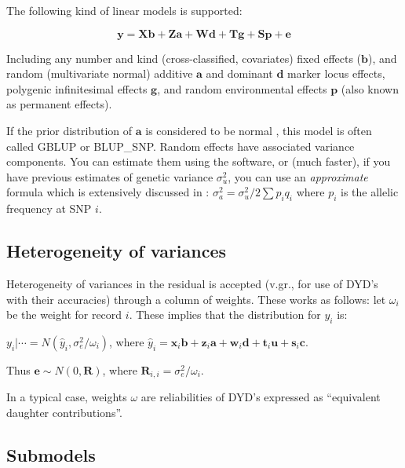 \documentclass[a4paper,12pt,titlepage]{article}      %
\newcommand{\bsr}{\mathbf} %
\begin{document}
The following kind of linear models is supported:

\begin{equation} \label{eq:SNPanimal}
 \bsr{y} = \bsr{X}\bsr{b} + \bsr{Za} + \bsr{Wd} + \bsr{Tg} + \bsr{Sp} + \bsr{e} 
\end{equation}

Including any number and kind (cross-classified, covariates) fixed effects ($\bsr{b}$), and random (multivariate normal) additive $\bsr{a}$ and dominant $\bsr{d}$ marker locus effects, polygenic infinitesimal effects $\bsr{g}$, and random environmental effects $\bsr{p}$ (also known as permanent effects).

 If the prior distribution of $\bsr{a}$ is considered to be normal \cite{VanRaden11012008}, this model is often called GBLUP or BLUP\_SNP. Random effects have associated variance components. You can estimate them using the software, or (much faster), if you have previous estimates of genetic variance $\sigma_u^2$, you can use an \emph{approximate} formula which is extensively discussed in \cite{Gianola2009a}:
$\sigma_a^2 = \sigma_u^2 / 2 \sum{p_i q_i}$
where $p_i$ is the allelic frequency at SNP $i$. 






\subsection{Heterogeneity of variances}


Heterogeneity of variances in the residual is accepted (v.gr., for use of DYD's with their accuracies) through a column of weights. These works as follows: let $\omega_i$ be the weight for record $i$. These implies that the distribution for $y_i$ is:

$y_i|\cdots = N(\hat{y}_i, \sigma_e^2 / \omega_i  )$, where 
$\hat{y}_i = \bsr{x}_i\bsr{b} + \bsr{z}_i\bsr{a} + \bsr{w}_i\bsr{d} + \bsr{t}_i\bsr{u} + \bsr{s}_i\bsr{c} $.

Thus $\bsr{e} \sim N(0,\bsr{R})$, where $\bsr{R}_{i,i} = \sigma_e^2 / \omega_i $.

In a typical case, weights $\omega$ are reliabilities of DYD's expressed as ``equivalent daughter contributions''. 

\subsection{Submodels}
\end{document}
